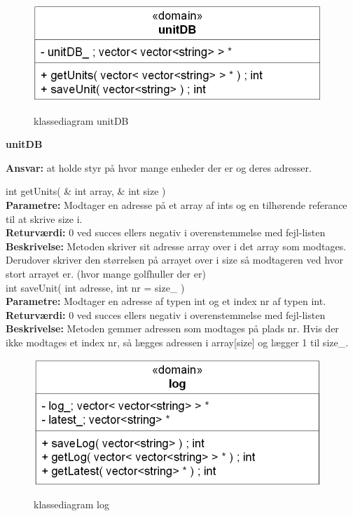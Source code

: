\newpage

\begin{figure}[htbp] \centering
{\includegraphics[scale=1.5]{filer/design/Klassediagrammer/sw_unitDB}}
\caption{klassediagram unitDB}
\label{fig:unitDB klassediagram}
\end{figure} 

{\centering
\textbf{unitDB}\par
}
\textbf{Ansvar:} at holde styr på hvor mange enheder der er og deres adresser. \

int getUnits( \& int array, \& int size ) \\
\textbf{Parametre:}  Modtager en adresse på et array af ints og en tilhørende referance til at skrive size i.\\
\textbf{Returværdi:} 0 ved succes ellers negativ i overenstemmelse med fejl-listen \\
\textbf{Beskrivelse:} Metoden skriver sit adresse array over i det array som modtages. Derudover skriver den størrelsen på arrayet over i size så modtageren ved hvor stort arrayet er. (hvor mange golfhuller der er)\\

int saveUnit( int adresse, int nr = size_ ) \\
\textbf{Parametre:} Modtager en adresse af typen int og et index nr af typen int. \\
\textbf{Returværdi:} 0 ved succes ellers negativ i overenstemmelse med fejl-listen \\
\textbf{Beskrivelse:}  Metoden gemmer adressen som modtages på plads nr. Hvis der ikke modtages et index nr, så lægges adressen i array[size] og lægger 1 til size_. \\

\begin{figure}[htbp] \centering
{\includegraphics[scale=1.5]{filer/design/Klassediagrammer/sw_log}}
\caption{klassediagram log}
\label{fig:log klassediagram}
\end{figure} 

